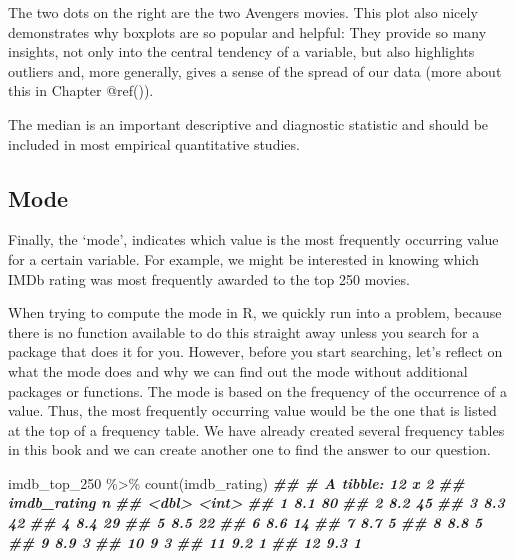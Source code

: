 \documentclass[
]{book}
\newenvironment{Shaded}{\begin{snugshade}}{\end{snugshade}}
\newcommand{\DocumentationTok}[1]{\textcolor[rgb]{0.56,0.35,0.01}{\textbf{\textit{#1}}}}
\newcommand{\FunctionTok}[1]{\textcolor[rgb]{0.00,0.00,0.00}{#1}}
\newcommand{\NormalTok}[1]{#1}
\newcommand{\SpecialCharTok}[1]{\textcolor[rgb]{0.00,0.00,0.00}{#1}}
\begin{document}
The two dots on the right are the two Avengers movies. This plot also nicely demonstrates why boxplots are so popular and helpful: They provide so many insights, not only into the central tendency of a variable, but also highlights outliers and, more generally, gives a sense of the spread of our data (more about this in Chapter @ref()).

The median is an important descriptive and diagnostic statistic and should be included in most empirical quantitative studies.

\hypertarget{mode}{%
\subsection{Mode}\label{mode}}

Finally, the `mode', indicates which value is the most frequently occurring value for a certain variable. For example, we might be interested in knowing which IMDb rating was most frequently awarded to the top 250 movies.

When trying to compute the mode in R, we quickly run into a problem, because there is no function available to do this straight away unless you search for a package that does it for you. However, before you start searching, let's reflect on what the mode does and why we can find out the mode without additional packages or functions. The mode is based on the frequency of the occurrence of a value. Thus, the most frequently occurring value would be the one that is listed at the top of a frequency table. We have already created several frequency tables in this book and we can create another one to find the answer to our question.

\begin{Shaded}
\begin{Highlighting}[]
\NormalTok{imdb\_top\_250 }\SpecialCharTok{\%\textgreater{}\%} \FunctionTok{count}\NormalTok{(imdb\_rating)}
\DocumentationTok{\#\# \# A tibble: 12 x 2}
\DocumentationTok{\#\#    imdb\_rating     n}
\DocumentationTok{\#\#          \textless{}dbl\textgreater{} \textless{}int\textgreater{}}
\DocumentationTok{\#\#  1         8.1    80}
\DocumentationTok{\#\#  2         8.2    45}
\DocumentationTok{\#\#  3         8.3    42}
\DocumentationTok{\#\#  4         8.4    29}
\DocumentationTok{\#\#  5         8.5    22}
\DocumentationTok{\#\#  6         8.6    14}
\DocumentationTok{\#\#  7         8.7     5}
\DocumentationTok{\#\#  8         8.8     5}
\DocumentationTok{\#\#  9         8.9     3}
\DocumentationTok{\#\# 10         9       3}
\DocumentationTok{\#\# 11         9.2     1}
\DocumentationTok{\#\# 12         9.3     1}
\end{Highlighting}
\end{Shaded}
\end{document}
